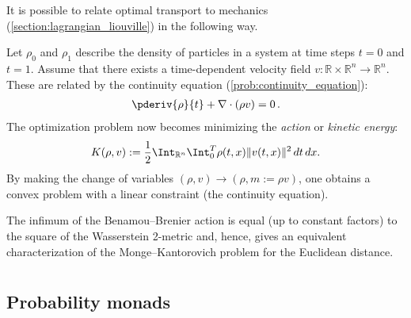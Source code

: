     It is possible to relate optimal transport to mechanics (\cref{section:lagrangian_liouville}) in the following way.
    \begin{method}
        Let $\rho_0$ and $\rho_1$ describe the density of particles in a system at time steps $t=0$ and $t=1$. Assume that there exists a time-dependent velocity field $v:\mathbb{R}\times\mathbb{R}^n\rightarrow\mathbb{R}^n$. These are related by the continuity equation (\cref{prob:continuity_equation}):
        \begin{gather}
            \pderiv{\rho}{t} + \nabla\cdot(\rho v) = 0\,.
        \end{gather}
        The optimization problem now becomes minimizing the \textit{action} or \textit{kinetic energy}:
        \begin{gather}
            K(\rho,v) := \frac{1}{2}\Int_{\mathbb{R}^n}\Int_0^T\rho(t,x)\|v(t,x)\|^2\,dt\,dx.
        \end{gather}
        By making the change of variables $(\rho,v)\longrightarrow(\rho,m:=\rho v)$, one obtains a convex problem with a linear constraint (the continuity equation).
    \end{method}
    \begin{property}
        The infimum of the Benamou--Brenier action is equal (up to constant factors) to the square of the Wasserstein 2-metric and, hence, gives an equivalent characterization of the Monge--Kantorovich problem for the Euclidean distance.
    \end{property}

\section{}
\subsection{Probability monads}

